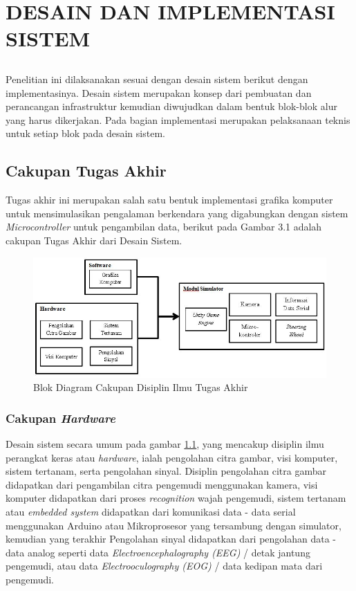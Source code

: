 \chapter{DESAIN DAN IMPLEMENTASI SISTEM}
\vspace{1ex}

\section*{}
	Penelitian ini dilaksanakan sesuai dengan desain sistem berikut dengan implementasinya. Desain sistem merupakan konsep dari pembuatan dan perancangan infrastruktur kemudian diwujudkan dalam bentuk blok-blok alur yang harus dikerjakan. Pada bagian implementasi merupakan pelaksanaan teknis untuk setiap blok pada desain sistem.
\vspace{1ex}

\section{Cakupan Tugas Akhir}
\vspace{1ex}

	Tugas akhir ini merupakan salah satu bentuk implementasi grafika komputer untuk mensimulasikan pengalaman berkendara yang digabungkan dengan sistem \textit{Microcontroller} untuk pengambilan data, berikut pada Gambar 3.1 adalah cakupan Tugas Akhir dari Desain Sistem.
\begin{figure}  [!htb]
	\captionsetup{justification=centering}
	\includegraphics[scale=0.55]{img/cakupanTA.JPG}
	\caption{Blok Diagram Cakupan Disiplin Ilmu Tugas Akhir}
	\label{fig: 3_1}
\end{figure}
\vspace{1ex}
    \subsection{Cakupan \textit{Hardware}}
    Desain sistem secara umum pada gambar \ref{fig: 3_1}, yang mencakup disiplin ilmu perangkat keras atau \textit{hardware}, ialah pengolahan citra gambar, visi komputer, sistem tertanam, serta pengolahan sinyal. Disiplin pengolahan citra gambar didapatkan dari pengambilan citra pengemudi menggunakan kamera, visi komputer didapatkan dari proses \textit{recognition} wajah pengemudi, sistem tertanam atau \textit{embedded system} didapatkan dari komunikasi data - data serial menggunakan Arduino atau Mikroprosesor yang tersambung dengan simulator, kemudian yang terakhir Pengolahan sinyal didapatkan dari pengolahan data - data analog seperti data \textit{Electroencephalography (EEG)} / detak jantung pengemudi, atau data \textit{Electrooculography (EOG)} / data kedipan mata dari pengemudi.
    
